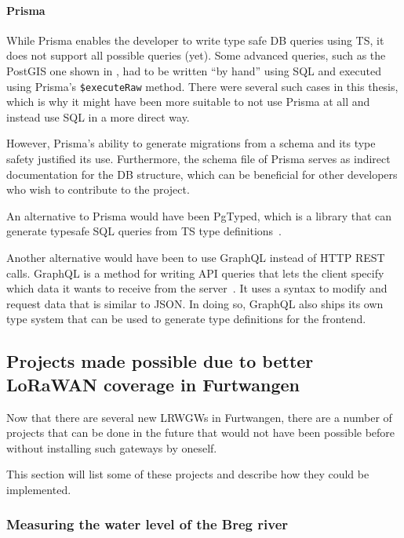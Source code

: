 \paragraph{Prisma}

While Prisma enables the developer to write type safe \ac{DB} queries using \ac{TS}, it does not support all possible queries (yet).
Some advanced queries, such as the PostGIS one shown in , had to be written ``by hand'' using \ac{SQL} and executed using Prisma's \lstinline|$executeRaw| method.
There were several such cases in this thesis, which is why it might have been more suitable to not use Prisma at all and instead use \ac{SQL} in a more direct way.

However, Prisma's ability to generate migrations from a schema and its type safety justified its use.
Furthermore, the schema file of Prisma serves as indirect documentation for the \ac{DB} structure, which can be beneficial for other developers who wish to contribute to the project.

An alternative to Prisma would have been PgTyped, which is a library that can generate typesafe \ac{SQL} queries from \ac{TS} type definitions~\cite{salakh_pgtyped_2023}.

Another alternative would have been to use GraphQL instead of \ac{HTTP} \ac{REST} calls.
GraphQL is a method for writing \ac{API} queries that lets the client specify which data it wants to receive from the server~\cite{graphql_foundation_graphql_2023}.
It uses a syntax to modify and request data that is similar to \ac{JSON}.
In doing so, GraphQL also ships its own type system that can be used to generate type definitions for the frontend.

\subsection{Projects made possible due to better \acs{LoRaWAN} coverage in Furtwangen}

Now that there are several new \aclp{LRWGW} in Furtwangen, there are a number of projects that can be done in the future that would not have been possible before without installing such gateways by oneself.

This section will list some of these projects and describe how they could be implemented.

\subsubsection{Measuring the water level of the Breg river}

